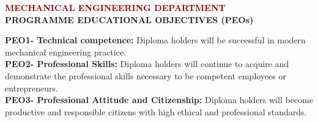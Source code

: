 \thispagestyle{empty}

\vspace*{-5mm}
\begin{center}
  {\fontsize{14}{18}\selectfont \bfseries \textcolor{darkred}{MECHANICAL ENGINEERING DEPARTMENT}}\\[4mm]
  {\fontsize{12}{15}\selectfont \bfseries \textcolor{navyblue}{PROGRAMME EDUCATIONAL OBJECTIVES (PEOs)}}\\[2mm]
\end{center}
\noindent
\textbf{PEO1- Technical competence:} Diploma holders will be successful in modern mechanical engineering practice.\\[1.5mm]
\textbf{PEO2- Professional Skills:} Diploma holders will continue to acquire and demonstrate the professional skills necessary to be competent employees or entrepreneurs.\\[1.5mm]
\textbf{PEO3- Professional Attitude and Citizenship:} Diploma holders will become productive and responsible citizens with high ethical and professional standards.

